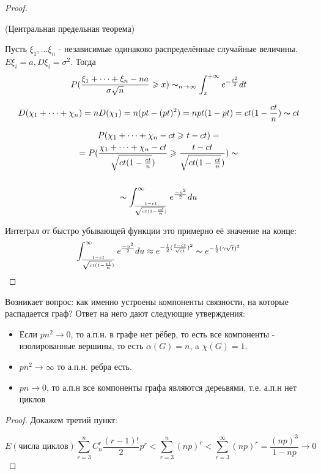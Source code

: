 \begin{proof}
\begin{theorem} (Центральная предельная теорема)

Пусть $\xi_1, \dots \xi_n$ - независимые одинаково распределённые случайные величины. $E\xi_i = a, D\xi_i = \sigma^2$. Тогда 
\[
P(\frac{\xi_1+\dots+\xi_n-na}{\sigma\sqrt{n}} \geq x
) \thicksim_{n\to \infty} \int_x^{+\infty} e^{-\frac{t^2}{2}}dt\]
   
\end{theorem}

\[
D(\chi_1+\dots+\chi_n) = nD(\chi_1) = n(pt-(pt)^2)= npt(1-pt) = ct(1-\frac{ct}{n}) \thicksim ct
\]

\begin{multline*}
P(\chi_1 + \dots + \chi_n-ct\geq t-ct) =\\
=P(\frac{\chi_1+\dots+\chi_n-ct}{\sqrt{ct(1-\frac{ct}{n}})} \geq \frac{t-ct}{\sqrt{ct(1-\frac{ct}{n}})}) \thicksim\\
\\\thicksim \int_{\frac{t-ct}{\sqrt{ct(1-\frac{ct}{n}})}}^{\infty} e^{\frac{-u^2}{2}}du
\end{multline*}

Интеграл от быстро убывающей функции это примерно её значение на конце:
\[
\int_{\frac{t-ct}{\sqrt{ct(1-\frac{ct}{n}})}}^{\infty} e^{\frac{-u^2}{2}}du
   \approx e^{-\frac{1}{2}({\frac{t-ct}{\sqrt{ct}}})^2}
   \thicksim e^{-\frac{1}{2}(\gamma \sqrt{t})^2}
\] 
\end{proof}

Возникает вопрос: как именно устроены компоненты связности, на которые распадается граф? Ответ на него дают следующие утверждения:

\begin{proposition}

\begin{itemize}
        \item Если $pn^2 \to 0$, то а.п.н. в графе нет рёбер, то есть все компоненты - изолированные вершины, то есть $\alpha(G) = n$, a $\chi(G) = 1$.
    \item $pn^2 \to \infty$ то а.п.н. ребра есть.
    \item $pn \to 0$, то а.п.н все компоненты графа являются дереьвями, т.е. а.п.н нет циклов
    \end{itemize}

    
\end{proposition}

\begin{proof}
Докажем третий пункт:

\[
E(\text{числа циклов})\sum_{r = 3}^n C_n^r \frac{(r-1)!}{2} p^r < \sum_{r = 3}^n (np)^r < \sum_{r =3}^{\infty} (np)^r = \frac{(np)^3}{1-np} \to 0
\]
\end{proof}



